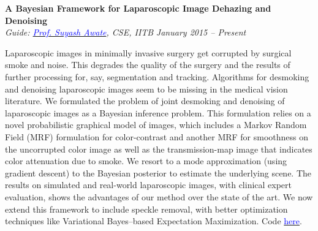 \documentclass[margin,line]{res}
\newenvironment{list1}{
  \begin{list}{\ding{113}}{%
      \setlength{\itemsep}{0in}
      \setlength{\parsep}{0in} \setlength{\parskip}{0in}
      \setlength{\topsep}{0in} \setlength{\partopsep}{0in} 
      \setlength{\leftmargin}{0.17in}}}{\end{list}}
\begin{document}
\begin{resume}
{\bf A Bayesian Framework for Laparoscopic Image Dehazing and Denoising} \\
{\em Guide: \href{https://www.cse.iitb.ac.in/~suyash}{\textcolor{blue}{Prof. Suyash Awate}}, CSE, IITB} \hfill {\it January 2015 -- Present} \\
\vspace*{-.13in}
\begin{list1}
\item[]
Laparoscopic images in minimally invasive surgery get corrupted by surgical smoke and noise. This degrades the quality of the surgery and the results of further processing for, say, segmentation and tracking. Algorithms for desmoking and denoising laparoscopic images seem to be missing in the medical vision literature. We formulated the problem of joint desmoking and denoising of laparoscopic images as a Bayesian inference problem. This formulation relies on a novel probabilistic graphical model of images, which includes a Markov Random Field (MRF) formulation for color-contrast and another MRF for smoothness on the uncorrupted color image as well as the transmission-map image that indicates color attenuation due to smoke. We resort to a mode approximation (using gradient descent) to the Bayesian posterior to estimate the underlying scene. The results on simulated and real-world laparoscopic images, with clinical expert evaluation, shows the advantages of our method over the state of the art. We now extend this framework to include speckle removal, with better optimization techniques like Variational Bayes--based Expectation Maximization. Code \href{https://github.com/alankarkotwal/lap-dehazing}{\textcolor{blue} {here}}.
\end{list1}


\end{resume}
\end{document}
